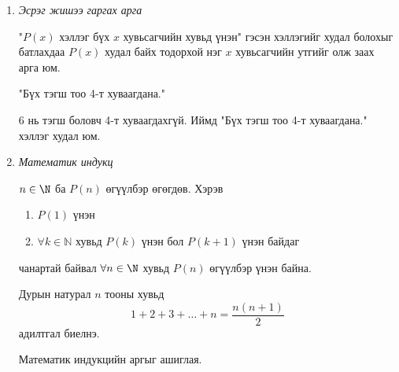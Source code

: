 \begin{enumerate}
Теорем \ref{Нийлмэл хэллэгийн үгүйсгэл} ёсоор $$\lnot(P\Rightarrow Q)\Leftrightarrow P\land\lnot Q$$ тул батлахыг хүссэн $P\Rightarrow Q$ хэллэгийн оронд $P\land\lnot Q$ хэллэгийг үнэн гэж үзээд, түүнээс логик дүгнэлтүүд гарган  зөрчилд ($R\land\lnot R$ маягийн) эсвэл боломжгүй тэгшитгэлд (жишээ нь $0=1$) хүрч батлах арга юм. Зөрчил гарсан тул $P\land\lnot Q\Rightarrow \lnot(P\Rightarrow Q)$ худал,  тэгэхээр $P\Rightarrow Q$ үнэн. Өөрөөр хэлбэл үнэн хэллэгээс худал хэллэг гарахгүй тул $\lnot(P\Rightarrow Q)$ худал гэсэн үг.
\begin{example} $\sqrt{2}$ иррационал тоо юм.
\begin{solution}
    $P$: "$\sqrt{2}$ бол иррационал" гэе. Эсрэгээр нь таамаглая: $\sqrt{2}$ рационал буюу $\lnot P=\{\sqrt{2}=\dfrac{a}{b}\}$ ($a,b\in\mathbb{Z}$, $\text{ХИЕХ}(a,b)=1$) үнэн гэе. Тэгвэл $2=\dfrac{a^2}{b^2}$, өөрөөр хэлбэл $a^2=2b^2$. Эндээс $a^2$ тэгш тул $a$ тэгш, $a=2k$. Иймд $2b^2=4k^2 \Rightarrow b^2=2k^2$, иймээс $b$ бас тэгш. Ингэснээр $a$ ба $b$ хоёул тэгш гарч, $\text{ХИЕХ}(a,b)=1$ гэсэн нөхцөлтэй зөрчилдөнө. Иймд $\lnot P$  таамаг худал, тэгэхээр анхны таамаг $\sqrt{2}$ иррационал тоо болов.
\end{solution}\end{example}
\item \it{Эсрэг жишээ гаргах арга}  

"$P(x)$ хэллэг бүх $x$ хувьсагчийн хувьд үнэн" гэсэн хэллэгийг худал болохыг батлахдаа $P(x)$ худал байх тодорхой нэг $x$ хувьсагчийн утгийг олж заах арга юм.
\begin{example}
 "Бүх тэгш тоо 4-т хуваагдана."   
\end{example}
\begin{solution}
 6 нь тэгш боловч 4-т хуваагдахгүй. Иймд "Бүх тэгш тоо 4-т хуваагдана." хэллэг худал юм. 
\end{solution}
\item \it{Математик индукц}


$n\in\N$ ба $P(n)$ өгүүлбэр өгөгдөв. Хэрэв 
\begin{enumerate}
    \item $P(1)$ үнэн
    \item $\forall k\in\mathbb{N}$ хувьд $ P(k)$ үнэн бол $P(k+1)$ үнэн байдаг
\end{enumerate} чанартай байвал $\forall n\in\N$ хувьд $P(n)$ өгүүлбэр үнэн байна. 
\begin{example}
Дурын натурал $n$ тооны хувьд 
\begin{equation}
1 + 2 + 3 + \dots + n = \frac{n(n+1)}{2}
\end{equation}
адилтгал биелнэ.
\begin{prof}
Математик индукцийн аргыг ашиглая.


\end{prof}
\end{example}
\end{enumerate}
